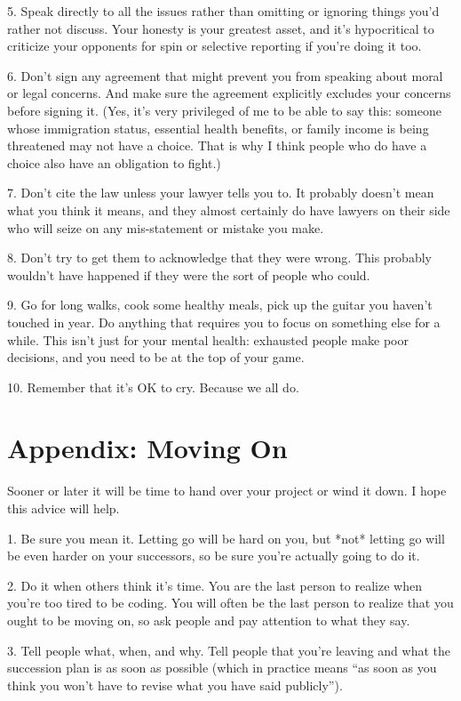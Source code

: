 \documentclass[10pt,letterpaper]{article}
\begin{document}
5. Speak directly to all the issues rather than omitting or ignoring things you'd rather not discuss.
   Your honesty is your greatest asset, and it's hypocritical to criticize your
   opponents for spin or selective reporting if you're doing it too.

6. Don't sign any agreement that might prevent you from speaking about moral or legal concerns.
   And make sure the agreement explicitly excludes your concerns before signing it.
   (Yes, it's very privileged of me to be able to say this: someone whose
   immigration status, essential health benefits, or family income is being
   threatened may not have a choice.  That is why I think people who do have a
   choice also have an obligation to fight.)

7. Don't cite the law unless your lawyer tells you to.
   It probably doesn't mean what you think it means, and they almost certainly do
   have lawyers on their side who will seize on any mis-statement or mistake you
   make.

8. Don't try to get them to acknowledge that they were wrong.
   This probably wouldn't have happened if they were the sort of people who could.

9. Go for long walks, cook some healthy meals, pick up the guitar you haven't touched in year.
   Do anything that requires you to focus on something else for a while.  This
   isn't just for your mental health: exhausted people make poor decisions, and you
   need to be at the top of your game.

10. Remember that it's OK to cry.
    Because we all do.

\section*{Appendix: Moving On}

Sooner or later it will be time to hand over your project or wind it down.
I hope this advice will help.

1.  Be sure you mean it.
    Letting go will be hard on you,
    but *not* letting go will be even harder on your successors,
    so be sure you're actually going to do it.

2.  Do it when others think it's time.
    You are the last person to realize when you're too tired to be coding.
    You will often be the last person to realize that you ought to be moving on,
    so ask people and pay attention to what they say.

3.  Tell people what, when, and why.
    Tell people that you're leaving and what the succession plan is as soon as possible
    (which in practice means ``as soon as you think you won't have to revise what you have said publicly'').
\end{document}
